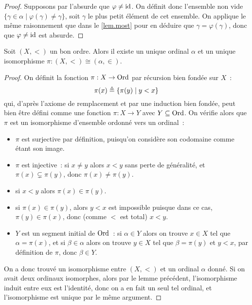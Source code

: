 \begin{proof}
  Supposons par l'absurde que $\varphi\neq\operatorname{id}$. On définit donc l'ensemble non
  vide $\{\gamma \in \alpha \mid \varphi(\gamma)\neq\gamma\}$, soit $\gamma$
  le plus petit élément de cet ensemble. On applique le même raisonnement que
  dans le \cref{lem.most} pour en déduire que $\gamma = \varphi(\gamma)$, donc
  que $\varphi\neq\operatorname{id}$ est absurde.
\end{proof}

\begin{proposition}
  Soit $(X,<)$ un bon ordre. Alors il existe un unique ordinal $\alpha$ et un
  unique isomorphisme $\pi : (X,<)\cong (\alpha,\in)$.
\end{proposition}

\begin{proof}
  On définit la fonction $\pi : X \to \operatorname{Ord}$ par récursion bien fondée sur
  $X$~:
  \[\pi(x)\triangleq \{ \pi(y) \mid y < x\}\]
  qui, d'après l'axiome de remplacement et par une induction bien fondée,
  peut bien être défini comme une fonction $\pi : X \to Y$ avec
  $Y\subseteq \operatorname{Ord}$. On vérifie alors que $\pi$ est un isomorphisme d'ensemble
  ordonné vers un ordinal~:
  \begin{itemize}
  \item $\pi$ est surjective par définition, puisqu'on considère son codomaine
    comme étant son image.
  \item $\pi$ est injective~: si $x\neq y$ alors $x < y$ sans perte de
    généralité, et $\pi(x) \subsetneq \pi(y)$, donc $\pi(x)\neq\pi(y)$.
  \item si $x < y$ alors $\pi(x) \in \pi(y)$.
  \item si $\pi(x) \in \pi(y)$, alors $y < x$ est impossible puisque dans ce
    cas, $\pi(y) \in \pi(x)$, donc (comme $<$ est total) $x < y$.
  \item $Y$ est un segment initial de $\operatorname{Ord}$~: si $\alpha \in Y$ alors on trouve
    $x \in X$ tel que $\alpha = \pi(x)$, et si $\beta \in \alpha$ alors
    on trouve $y\in X$ tel que $\beta = \pi(y)$ et $y < x$, par définition de
    $\pi$, donc $\beta \in Y$.
  \end{itemize}
  On a donc trouvé un isomorphisme entre $(X,<)$ et un ordinal $\alpha$ donné.
  Si on avait deux ordinaux isomorphes, alors par le lemme précédent,
  l'isomorphisme induit entre eux est l'identité, donc on a en fait un seul
  tel ordinal, et l'isomorphisme est unique par le même argument.
\end{proof}

